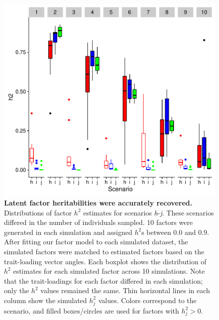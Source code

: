 \documentclass[12pt,titlepage]{article}
\begin{document}
\begin{figure}[b]
\begin{center}
\includegraphics[width=5in]{Figures/factor_h2s.pdf}
\caption[Heritability of latent factors]{ \textbf{Latent factor heritabilities were accurately recovered.} Distributions of factor $h^2$ estimates for scenarios \emph{h}-\emph{j}. These scenarios differed in the number of individuals sampled. 10 factors were generated in each simulation and assigned $h^2$s between 0.0 and 0.9. After fitting our factor model to each simulated dataset,  the simulated factors were matched to estimated factors based on the trait-loading vector angles. Each boxplot shows the distribution of $h^2$ estimates for each simulated factor across 10 simulations. Note that the trait-loadings for each factor differed in each simulation; only the $h^2$ values remained the same. Thin horizontal lines in each column show the simulated $h^2_j$ values. Colors correspond to the scenario, and filled boxes/circles are used for factors with $h^2_j > 0$.}
\label{fig:factor_h2s_D}
\end{center}
\end{figure}
\end{document}
